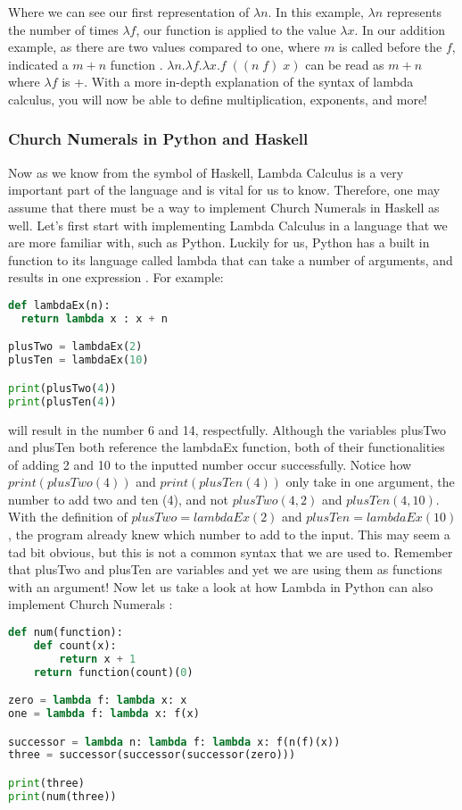 \documentclass{article}
\begin{document}
\noindent
Where we can see our first representation of $\lambda n$. In this example, $\lambda n$ represents the number of times $\lambda f$, our function is applied to the value $\lambda x$. In our addition example, as there are two values compared to one, where $m$ is called before the $f$, indicated a $m+n$ function \cite{CE}. $\lambda n. \lambda f. \lambda x.f \; ((n \; f) \; x)$ can be read as $m + n$ where $\lambda f$ is +. With a more in-depth explanation of the syntax of lambda calculus, you will now be able to define multiplication, exponents, and more!

\subsubsection{Church Numerals in Python and Haskell}
Now as we know from the symbol of Haskell, Lambda Calculus is a very important part of the language and is vital for us to know. Therefore, one may assume that there must be a way to implement Church Numerals in Haskell as well. Let's first start with implementing Lambda Calculus in a language that we are more familiar with, such as Python. Luckily for us, Python has a built in function to its language called lambda that can take a number of arguments, and results in one expression \cite{LCP}. For example:
\begin{lstlisting}[language=Python]
def lambdaEx(n):
  return lambda x : x + n

plusTwo = lambdaEx(2)
plusTen = lambdaEx(10)

print(plusTwo(4)) 
print(plusTen(4)) 
\end{lstlisting}

\noindent
will result in the number 6 and 14, respectfully. Although the variables plusTwo and plusTen both reference the lambdaEx function, both of their functionalities of adding 2 and 10 to the inputted number occur successfully. Notice how $print(plusTwo(4))$ and $print(plusTen(4))$ only take in one argument, the number to add two and ten (4), and not $plusTwo(4, 2)$ and $plusTen(4, 10)$. With the definition of $plusTwo = lambdaEx(2)$ and $plusTen = lambdaEx(10)$, the program already knew which number to add to the input. This may seem a tad bit obvious, but this is not a common syntax that we are used to. Remember that plusTwo and plusTen are variables and yet we are using them as functions with an argument! Now let us take a look at how Lambda in Python can also implement Church Numerals \cite{LCP}:

\begin{lstlisting}[language=Python]
def num(function):
    def count(x):
        return x + 1
    return function(count)(0)

zero = lambda f: lambda x: x
one = lambda f: lambda x: f(x)

successor = lambda n: lambda f: lambda x: f(n(f)(x))
three = successor(successor(successor(zero)))

print(three)
print(num(three))
\end{lstlisting}
\end{document}
